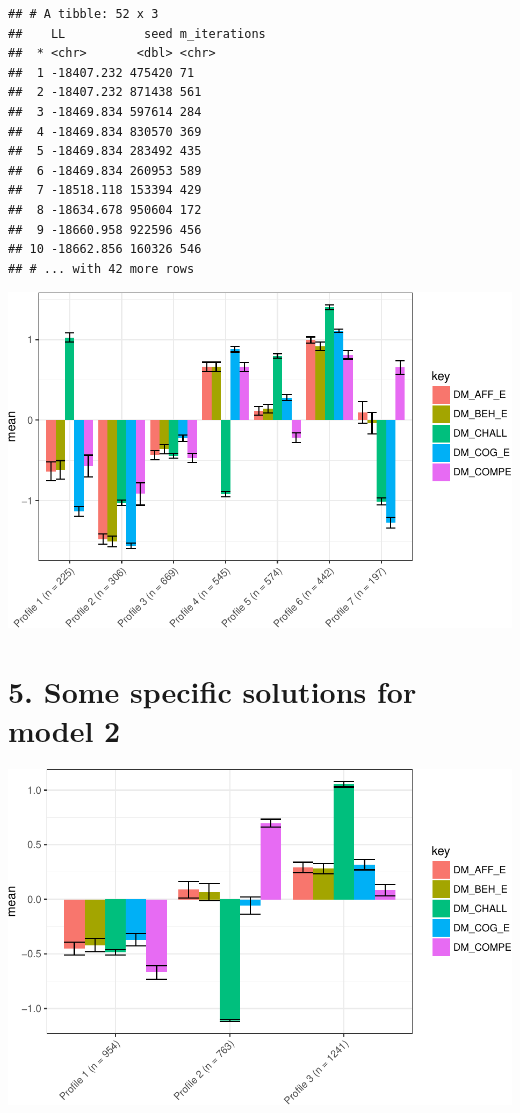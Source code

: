 \documentclass[]{book}
\theoremstyle{definition}
\theoremstyle{definition}
\theoremstyle{definition}
\theoremstyle{remark}
\begin{document}
\begin{verbatim}
## # A tibble: 52 x 3
##    LL           seed m_iterations
##  * <chr>       <dbl> <chr>       
##  1 -18407.232 475420 71          
##  2 -18407.232 871438 561         
##  3 -18469.834 597614 284         
##  4 -18469.834 830570 369         
##  5 -18469.834 283492 435         
##  6 -18469.834 260953 589         
##  7 -18518.118 153394 429         
##  8 -18634.678 950604 172         
##  9 -18660.958 922596 456         
## 10 -18662.856 160326 546         
## # ... with 42 more rows
\end{verbatim}

\includegraphics{rosenberg-dissertation_files/figure-latex/anotherm1-7-solution-1.pdf}

\section{5. Some specific solutions for model
2}\label{some-specific-solutions-for-model-2}

\includegraphics{rosenberg-dissertation_files/figure-latex/spec-solutions-model2-3-1.pdf}
\end{document}
